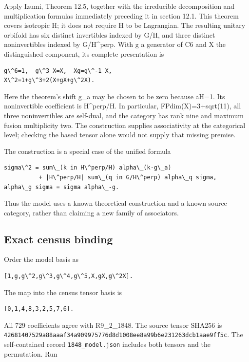 Apply Izumi, Theorem 12.5, together with the irreducible decomposition
and multiplication formulas immediately preceding it in section 12.1.
This theorem covers isotropic H; it does not require H to be Lagrangian.
The resulting unitary orbifold has six distinct invertibles indexed by
G/H, and three distinct noninvertibles indexed by G/H\^{}perp. With g a
generator of C6 and X the distinguished component, its complete
presentation is

\begin{verbatim}
g\^6=1,  g\^3 X=X,  Xg=g\^-1 X,
X\^2=1+g\^3+2(X+gX+g\^2X).
\end{verbatim}

Here the theorem's shift g\_a may be chosen to be zero because
a\textbar H=1. Its noninvertible coefficient is
\textbar H\^{}perp/H. In particular, FPdim(X)=3+sqrt(11), all
three noninvertibles are self-dual, and the category has rank nine and
maximum fusion multiplicity two. The construction supplies associativity
at the categorical level; checking the based tensor alone would not
supply that missing premise.

The construction is a special case of the unified formula

\begin{verbatim}
sigma\^2 = sum\_(k in H\^perp/H) alpha\_(k-g\_a)
          + |H\^perp/H| sum\_(q in G/H\^perp) alpha\_q sigma,
alpha\_g sigma = sigma alpha\_-g.
\end{verbatim}

Thus the model uses a known theoretical construction and a known source
category, rather than claiming a new family of associators.

\hypertarget{exact-census-binding}{%
\subsection{Exact census binding}\label{exact-census-binding}}

Order the model basis as

\begin{verbatim}
[1,g,g\^2,g\^3,g\^4,g\^5,X,gX,g\^2X].
\end{verbatim}

The map into the census tensor basis is

\begin{verbatim}
[0,1,4,8,3,2,5,7,6].
\end{verbatim}

All 729 coefficients agree with R9\_2\_1848. The source tensor SHA256 is
\texttt{426814\allowbreak{}07529a\allowbreak{}88aaaf\allowbreak{}34a909\allowbreak{}975776\allowbreak{}d8d100\allowbreak{}8ee8a9\allowbreak{}9b6e23\allowbreak{}1263dc\allowbreak{}b1aae9\allowbreak{}ff5c}.
The self-contained record
\texttt{1848\_\allowbreak{}model.\allowbreak{}json} includes both
tensors and the permutation. Run

